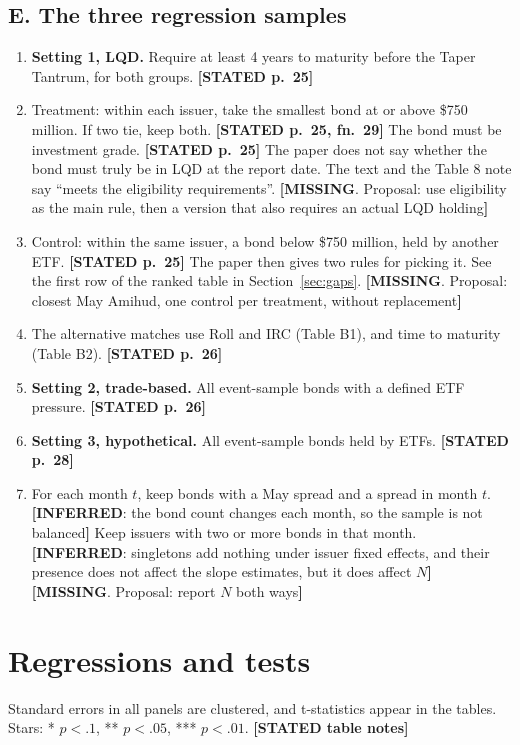 \documentclass[10pt,a4paper]{article}
\newcommand{\ST}[1]{\textcolor{cst}{\textbf{[STATED #1]}}}
\newcommand{\IN}[1]{\textcolor{cin}{\textbf{[INFERRED}: #1\textbf{]}}}
\newcommand{\MI}[1]{\textcolor{cmi}{\textbf{[MISSING}. Proposal: #1\textbf{]}}}
\begin{document}
\subsection*{E. The three regression samples}
\begin{enumerate}[resume]
\item \textbf{Setting 1, LQD.} Require at least 4 years to maturity before the Taper Tantrum, for both groups. \ST{p.~25}
\item Treatment: within each issuer, take the smallest bond at or above \$750 million. If two tie, keep both. \ST{p.~25, fn.~29} The bond must be investment grade. \ST{p.~25} The paper does not say whether the bond must truly be in LQD at the report date. The text and the Table 8 note say ``meets the eligibility requirements''. \MI{use eligibility as the main rule, then a version that also requires an actual LQD holding}
\item Control: within the same issuer, a bond below \$750 million, held by another ETF. \ST{p.~25} The paper then gives two rules for picking it. See the first row of the ranked table in Section~\ref{sec:gaps}. \MI{closest May Amihud, one control per treatment, without replacement}
\item The alternative matches use Roll and IRC (Table B1), and time to maturity (Table B2). \ST{p.~26}
\item \textbf{Setting 2, trade-based.} All event-sample bonds with a defined ETF pressure. \ST{p.~26}
\item \textbf{Setting 3, hypothetical.} All event-sample bonds held by ETFs. \ST{p.~28}
\item For each month $t$, keep bonds with a May spread and a spread in month $t$. \IN{the bond count changes each month, so the sample is not balanced} Keep issuers with two or more bonds in that month. \IN{singletons add nothing under issuer fixed effects, and their presence does not affect the slope estimates, but it does affect $N$} \MI{report $N$ both ways}
\end{enumerate}

\section{Regressions and tests}\label{sec:reg}

Standard errors in all panels are clustered, and t-statistics appear in the tables. Stars: * $p<.1$, ** $p<.05$, *** $p<.01$. \ST{table notes}
\end{document}
